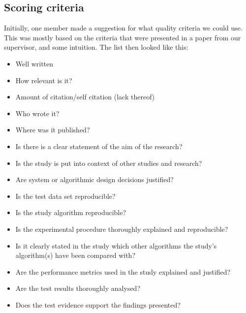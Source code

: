 \subsection{Scoring criteria}
\label{sub:scoring_criteria}
Initially, one member made a suggestion for what quality criteria we could use. This was mostly based on the criteria that were presented in a paper from our supervisor, and some intuition. The list then looked like this:
\begin{itemize}
\item Well written
\item How relevant is it?
\item Amount of citation/self citation (lack thereof)
\item Who wrote it?
\item Where was it published?
\item Is there is a clear statement of the aim of the research?
\item Is the study is put into context of other studies and research?
\item Are system or algorithmic design decisions justified?
\item Is the test data set reproducible?
\item Is the study algorithm reproducible?
\item Is the experimental procedure thoroughly explained and reproducible?
\item Is it clearly stated in the study which other algorithms the study's algorithm(s) have been compared with?
\item Are the performance metrics used in the study explained and justified?
\item Are the test results thoroughly analysed?
\item Does the test evidence support the findings presented?
\end{itemize}

